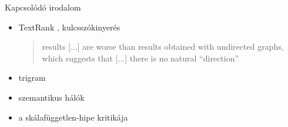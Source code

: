 \documentclass{beamer}
\newlength{\sepwid}
\newlength{\onecolwid}
\newlength{\twocolwid}
\begin{document}
\begin{frame}[t]
\begin{columns}[t]
\begin{column}{\twocolwid}
\begin{columns}
          \begin{column}{\sepwid} \end{column}   %

            \begin{column}{\onecolwid}
              \begin{block}{Kapcsolódó irodalom}
                \begin{itemize}
                  \item TextRank \citep{mihalcea2004textrank}, kulcsszókinyerés
                    \begin{quote}
                      results [...] are worse than results obtained with undirected
                          graphs, which suggests that [...] there is no natural “direction”
                    \end{quote}
                  \item trigram \citep{cancho2001thesmall}
                  \item szemantikus hálók \citep{steyvers2005large}
                  \item a skálafüggetlen-hipe kritikája
                    \citep{willinger2009mathematics}
                \end{itemize}
              \end{block}
            \end{column}
        \end{columns}



                \newcommand{\hugeskip}{\vspace{2cm}}
                \hugeskip


\end{column}
\end{columns}
\end{frame}
\end{document}

